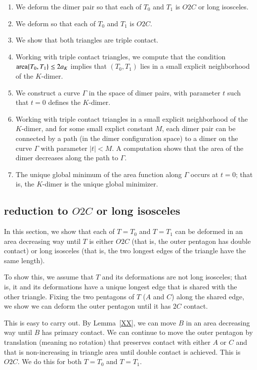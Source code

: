 \begin{enumerate}
\item We deform the dimer pair so that each of $T_0$ and $T_1$ is $O2C$
or long isosceles.
\item We deform so that each of $T_0$ and $T_1$ is $O2C$.
\item We show that both triangles are triple contact.
\item Working with triple contact triangles, 
we compute that the condition ${\operatorname{area}}\{T_0,T_1\}\le 2a_K$ implies that
$(T_0,T_1)$ lies in a small explicit neighborhood of the $K$-dimer.
\item We construct a curve $\Gamma$ in the space of dimer pairs, with parameter $t$
such that $t=0$ defines the $K$-dimer.
\item Working with triple contact triangles in a small explicit neighborhood of the
$K$-dimer, and for some small explict constant $M$,
each dimer pair can be connected by a path (in the dimer configuration
space) to a dimer on the curve $\Gamma$ with parameter $|t|<M$.
A computation shows that the area of the dimer decreases along the path to $\Gamma$.  
\item The unique global minimum of the area function along $\Gamma$ occurs at $t=0$;
that is, the $K$-dimer is the unique global minimizer.
\end{enumerate}

\subsection{reduction to $O2C$ or long isosceles}



In this section, we show that each of $T=T_0$ and $T=T_1$ can be deformed in an area
decreasing way until $T$ is either $O2C$ (that is, the outer pentagon has double contact)
or long isosceles (that is, the two longest edges of the triangle have the same length).

To show this, we assume that $T$ and its deformations are not long isosceles;  that is,
it and its deformations have a unique longest edge that is shared with the other triangle.  Fixing the two pentagons of $T$
($A$ and $C$) along the shared edge, we show we can deform the outer pentagon until it has $2C$ contact.

This is easy to carry out.  By Lemma~\ref{XX}, we can move $B$ in an area decreasing way until $B$ has primary
contact.  We can continue to move the outer pentagon by translation (meaning no rotation) that preserves contact with either
$A$ or $C$ and that is non-increasing in triangle area until double contact is achieved.  This is $O2C$.
We do this for both $T=T_0$ and $T=T_1$.

